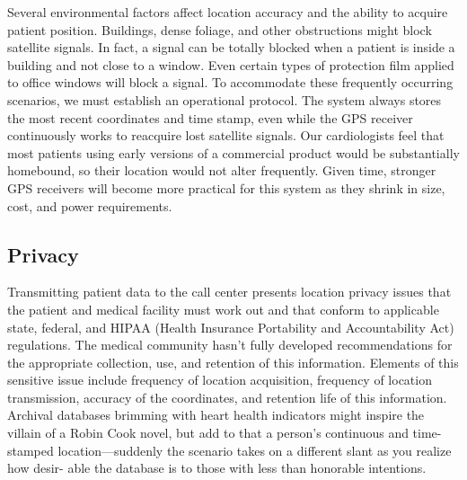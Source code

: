 \documentclass[a4paper,12pt]{article}
\begin{document}
Several environmental factors affect location accuracy and the ability to acquire patient position. Buildings, dense foliage, and other obstructions might block satellite signals. In fact, a signal can be totally blocked when a patient is inside a building and not close to a window. Even certain types of protection film applied to office windows will block a signal. To accommodate these frequently occurring scenarios, we must establish an operational protocol. The system always stores the most recent coordinates and time stamp, even while the GPS receiver continuously works to reacquire lost satellite signals. Our cardiologists feel that most patients using early versions of a commercial product would be substantially homebound, so their location would not alter frequently. Given time, stronger GPS receivers will become more practical for this system as they shrink in size, cost, and power requirements.

\subsection{Privacy}


Transmitting patient data to the call center presents location privacy issues that the patient and medical facility must work out and that conform to applicable state, federal, and HIPAA (Health Insurance Portability and Accountability Act) regulations. The medical community hasn’t fully developed recommendations for the appropriate collection, use, and retention of this information. Elements of this sensitive issue include frequency of location acquisition, frequency of location transmission, accuracy of the coordinates, and retention life of this information. Archival databases brimming with heart health indicators might inspire the villain of a Robin Cook novel, but add to that a person’s continuous and time-stamped location—suddenly the scenario takes on a different slant as you realize how desir- able the database is to those with less than honorable intentions.
\end{document}
